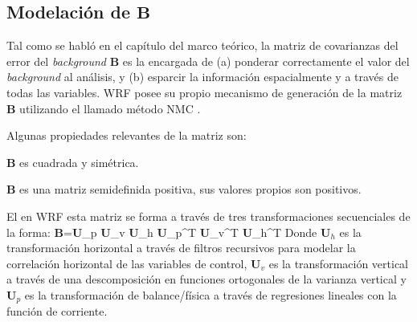 \subsection{Modelación de $\textbf{B}$}
Tal como se habló en el capítulo del marco teórico, la matriz de covarianzas del error del \emph{background} $\textbf{B}$ es la encargada de (a) ponderar correctamente el valor del \emph{background} al análisis, y (b) esparcir la información espacialmente y a través de todas las variables. WRF posee su propio mecanismo de generación de la matriz $\textbf{B}$ utilizando el llamado método NMC \cite{https://doi.org/10.5065/d68s4mvh}.

Algunas propiedades relevantes de la matriz son:
\begin{itemize*}
	\item $\textbf{B}$ es cuadrada y simétrica.
	\item $\textbf{B}$ es una matriz semidefinida positiva, sus valores propios son positivos. 
\end{itemize*}

El en WRF esta matriz se forma a través de tres transformaciones secuenciales de la forma:
\be 
\textbf{B}=\textbf{U}_p \textbf{U}_v \textbf{U}_h \textbf{U}_p^T \textbf{U}_v^T \textbf{U}_h^T 
\ee
Donde $\textbf{U}_h$ es la transformación horizontal a través de filtros recursivos para modelar la correlación horizontal de las variables de control, $\textbf{U}_v$ es la transformación vertical a través de una descomposición en funciones ortogonales de la varianza vertical y $\textbf{U}_p$ es la transformación de balance/física a través de regresiones lineales con la función de corriente.